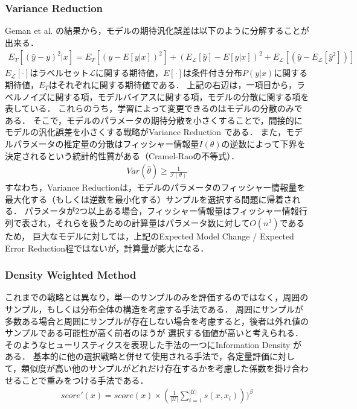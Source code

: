 \subsubsection{Variance Reduction \cite{cohn1994improving}}
Geman et al. \cite{geman2008neural}の結果から，モデルの期待汎化誤差は以下のように分解することが出来る．
\begin{eqnarray}
    E_T [(\hat{y} - y)^2|x] = E_T [(y - E[y|x])^2] + (E_{\mathcal{L}}[\hat{y}] - E[y|x])^2 + E_{\mathcal{L}} [(\hat{y} - E_{\mathcal{L}}[\hat{y}^2])]
\end{eqnarray}
$E_{\mathcal{L}}[\cdot]$はラベルセット$\mathcal{L}$に関する期待値，$E[\cdot]$は条件付き分布$P(y|x)$に関する期待値，$E_T$はそれぞれに関する期待値である．
上記の右辺は，一項目から，ラベルノイズに関する項，モデルバイアスに関する項，モデルの分散に関する項を表している．
これらのうち，学習によって変更できるのはモデルの分散のみである．
そこで，モデルのパラメータの期待分散を小さくすることで，間接的にモデルの汎化誤差を小さくする戦略がVariance Reduction \cite{cohn1994improving}である．
また，モデルパラメータの推定量の分散はフィッシャー情報量$I(\theta)$の逆数によって下界を決定されるという統計的性質がある（Cramel-Raoの不等式）．
\begin{eqnarray}
    Var(\hat{\theta}) \geq \frac{1}{\mathcal{I(\theta)}}
\end{eqnarray}
すなわち，Variance Reductionは，モデルのパラメータのフィッシャー情報量を最大化する（もしくは逆数を最小化する）サンプルを選択する問題に帰着される．
パラメータが2つ以上ある場合，フィッシャー情報量はフィッシャー情報行列で表され，それらを扱うための計算量はパラメータ数に対して$O(n^3)$であるため，
巨大なモデルに対しては，上記のExpected Model Change / Expected Error Reduction程ではないが，計算量が膨大になる．

\subsubsection{Density Weighted Method}
これまでの戦略とは異なり，単一のサンプルのみを評価するのではなく，周囲のサンプル，もしくは分布全体の構造を考慮する手法である．
周囲にサンプルが多数ある場合と周囲にサンプルが存在しない場合を考慮すると，後者は外れ値のサンプルである可能性が高く前者のほうが
選択する価値が高いと考えられる．
そのようなヒューリスティクスを表現した手法の一つにInformation Density \cite{settles2008analysis}がある．
基本的に他の選択戦略と併せて使用される手法で，各定量評価に対して，類似度が高い他のサンプルがどれだけ存在するかを考慮した係数を掛け合わせることで重みをつける手法である．
\begin{eqnarray}
    score'(x) = score(x) \times (\frac{1}{|\mathcal{U}|} \sum_{i=1}^{|\mathcal{U}|} s(x, x_i)))^{\beta}
\end{eqnarray}

